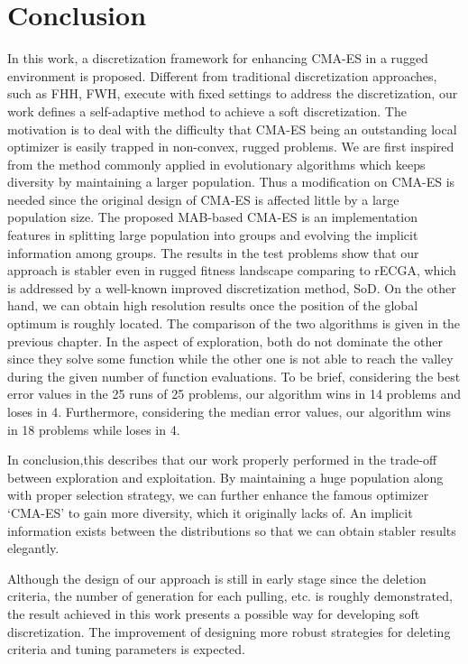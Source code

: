 \chapter{Conclusion} \label{ch:conclusion}

In this work, a discretization framework for enhancing CMA-ES in a
rugged environment is proposed.
Different from traditional discretization approaches, such as FHH,
FWH, execute with fixed settings to address the discretization,
our work defines a self-adaptive method to achieve a soft
discretization.
The motivation is to deal with the difficulty that CMA-ES being an
outstanding local optimizer is easily trapped in non-convex, rugged
problems.
We are first inspired from the method commonly applied in evolutionary
algorithms which keeps diversity by maintaining a larger population.
Thus a modification on CMA-ES is needed since the original design of
CMA-ES is affected little by a large population size. 
The proposed MAB-based CMA-ES is an implementation features in splitting
large population into groups and evolving the implicit information among
groups.
The results in the test problems show that our approach is stabler even
in rugged fitness landscape comparing to rECGA, which is addressed by a
well-known improved discretization method, SoD.
On the other hand, we can obtain high resolution results once the
position of the global optimum is roughly located.
The comparison of the two algorithms is given in the previous chapter.
In the aspect of exploration, both do not dominate the other since they
solve some function while the other one is not able to reach the valley
during the given number of function evaluations.
To be brief, considering the best error values in the 25 runs of 25
problems, our algorithm wins in 14 problems and loses in 4.
Furthermore, considering the median error values, our algorithm wins in
18 problems while loses in 4.

In conclusion,this describes that our work properly performed in the
trade-off between exploration and exploitation.
By maintaining a huge population along with proper selection strategy,
we can further enhance the famous optimizer `CMA-ES' to gain more
diversity, which it originally lacks of. 
An implicit information exists between the distributions so that we can
obtain stabler results elegantly.

Although the design of our approach is still in early stage since the
deletion criteria, the number of generation for each pulling, etc.
is roughly demonstrated, the result achieved in this work presents a
possible way for developing soft discretization.
The improvement of designing more robust strategies for deleting
criteria and tuning parameters is expected.

